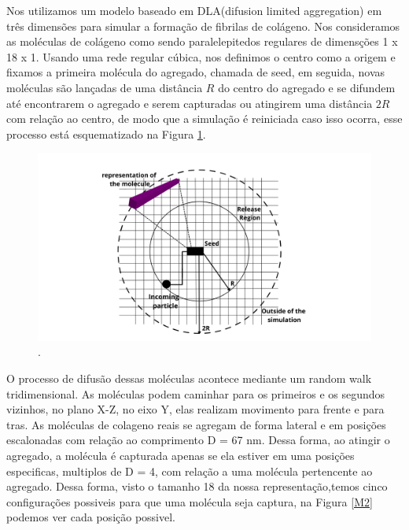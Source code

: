\documentclass{article}
\begin{document}
        Nos utilizamos um modelo baseado em DLA(difusion limited aggregation)\cite{Witten1983} em três dimensões para 
        simular a formação de fibrilas de colágeno. Nos consideramos as moléculas de colágeno como  sendo paralelepitedos 
        regulares de dimensções 1 x 18 x 1. Usando uma rede regular cúbica, nos definimos o centro como a origem e fixamos
        a primeira molécula do agregado, chamada de seed, em seguida, novas moléculas são lançadas de uma distância $R$ do 
        centro  do agregado e se difundem até encontrarem o agregado e serem capturadas ou atingirem 
        uma distância  $2R$ com relação ao centro, de modo que a simulação é reiniciada caso isso ocorra, esse processo está 
        esquematizado na Figura \ref{M1}. 

        \begin{figure}[H]
            \centering
            \includegraphics[width=\textwidth]{figures/DLA.png}
    
            \caption{.} 
    
            \label{M1}
        \end{figure}
    
        O processo de difusão dessas moléculas acontece mediante um random walk tridimensional.  As moléculas podem caminhar
        para os primeiros e os segundos vizinhos, no plano X-Z, no eixo Y, elas realizam movimento para frente e para tras. As moléculas 
        de colageno reais se agregam de forma lateral e em posições escalonadas com relação ao comprimento D = 67 nm. Dessa forma,
        ao atingir o agregado, a molécula é capturada apenas se ela estiver em uma posições especificas, multiplos de D = 4, com relação 
        a uma molécula pertencente ao agregado\cite{Parkinson1995}.  Dessa forma, visto o tamanho 18 da nossa representação,temos cinco 
        configurações possiveis para que uma molécula seja captura, na Figura \ref{M2} podemos ver cada posição possivel. 
\end{document}
